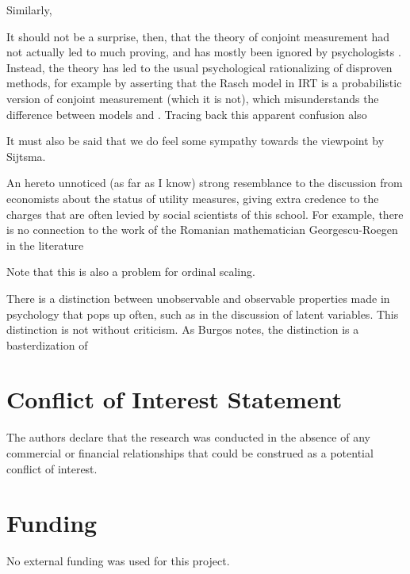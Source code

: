 \documentclass[utf8]{FrontiersinVancouver}
\begin{document}
Similarly, 

It should not be a surprise, then, that the theory of conjoint measurement had not actually led to much proving, and has mostly been ignored by psychologists \citep{cliffAbstractMeasurementTheory1992}. Instead, the theory has led to the usual psychological rationalizing of disproven methods, for example by asserting that the Rasch model in IRT is a probabilistic version of conjoint measurement (which it is not), which misunderstands the difference between models and . Tracing back this apparent confusion also 

It must also be said that we do feel some sympathy towards the viewpoint by Sijtsma\citep{sijtsmaPsychologicalMeasurementPhysics2012}. 

An hereto unnoticed (as far as I know) strong resemblance to the discussion from economists about the status of utility measures, giving extra credence to the charges that are often levied by social scientists of this school. For example, there is no connection to the work of the Romanian mathematician Georgescu-Roegen in the literature  

Note that this is also a problem for ordinal scaling. 

There is a distinction between unobservable and observable properties made in psychology that pops up often, such as in the discussion of latent variables. This distinction is not without criticism. As Burgos notes, the distinction is a basterdization of 






\section*{Conflict of Interest Statement}
The authors declare that the research was conducted in the absence of any commercial or financial relationships that could be construed as a potential conflict of interest.

\section*{Funding}
No external funding was used for this project.
\end{document}

